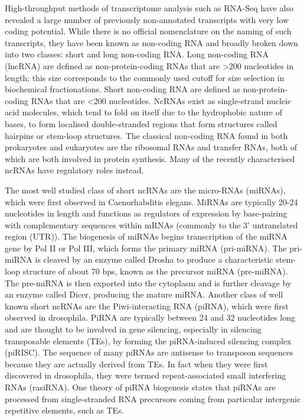 High-throughput methods of transcriptome analysis such as RNA-Seq have also revealed a large number of previously non-annotated transcripts with very low coding potential. While there is no official nomenclature on the naming of such transcripts, they have been known as non-coding RNA and broadly broken down into two classes: short and long non-coding RNA. Long non-coding RNA (lncRNA) are defined as non-protein-coding RNAs that are \textgreater200 nucleotides in length; this size corresponds to the commonly used cutoff for size selection in biochemical fractionations. Short non-coding RNA are defined as non-protein-coding RNAs that are \textless200 nucleotides. NcRNAs exist as single-strand nucleic acid molecules, which tend to fold on itself due to the hydrophobic nature of bases, to form localised double-stranded regions that form structures called hairpins or stem-loop structures. The classical non-coding RNA found in both prokaryotes and eukaryotes are the ribosomal RNAs and transfer RNAs, both of which are both involved in protein synthesis. Many of the recently characterised ncRNAs have regulatory roles instead\cite{pmid24776770}.

The most well studied class of short ncRNAs are the micro-RNAs (miRNAs), which were first observed in Caenorhabditis elegans\cite{pmid8252621}. MiRNAs are typically 20-24 nucleotides in length and functions as regulators of expression by base-pairing with complementary sequences within mRNAs (commonly to the 3' untranslated region (UTR)). The biogenesis of miRNAs begins transcription of the miRNA gene by Pol II or Pol III, which forms the primary miRNA (pri-miRNA). The pri-miRNA is cleaved by an enzyme called Drosha\cite{pmid14508493} to produce a characteristic stem-loop structure of about 70 bps, known as the precursor miRNA (pre-miRNA). The pre-miRNA is then exported into the cytoplasm and is further cleavage by an enzyme called Dicer\cite{pmid11201747}, producing the mature miRNA. Another class of well known short ncRNAs are the Piwi-interacting RNA (piRNA), which were first observed in drosophila\cite{pmid11470406}. PiRNA are typically between 24 and 32 nucleotides long and are thought to be involved in gene silencing, especially in silencing transposable elements (TEs), by forming the piRNA-induced silencing complex (piRISC). The sequence of many piRNAs are antisense to transposon sequences because they are actually derived from TEs. In fact when they were first discovered in drosophila, they were termed repeat-associated small interfering RNAs (rasiRNA). One theory of piRNA biogenesis states that piRNAs are processed from single-stranded RNA precursors coming from particular intergenic repetitive elements, such as TEs\cite{pmid21427766}.

